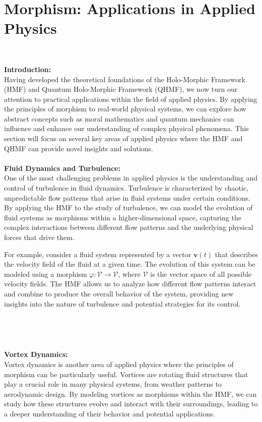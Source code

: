 \documentclass{article}
\begin{document}
\section*{Morphism: Applications in Applied Physics}
\

\textbf{Introduction:}
\\

Having developed the theoretical foundations of the Holo-Morphic Framework (HMF) and Quantum Holo-Morphic Framework (QHMF), we now turn our attention to practical applications within the field of applied physics. By applying the principles of morphism to real-world physical systems, we can explore how abstract concepts such as moral mathematics and quantum mechanics can influence and enhance our understanding of complex physical phenomena. This section will focus on several key areas of applied physics where the HMF and QHMF can provide novel insights and solutions.
\\
\\

\textbf{Fluid Dynamics and Turbulence:}
\\

One of the most challenging problems in applied physics is the understanding and control of turbulence in fluid dynamics. Turbulence is characterized by chaotic, unpredictable flow patterns that arise in fluid systems under certain conditions. By applying the HMF to the study of turbulence, we can model the evolution of fluid systems as morphisms within a higher-dimensional space, capturing the complex interactions between different flow patterns and the underlying physical forces that drive them.

For example, consider a fluid system represented by a vector \( \mathbf{v}(t) \) that describes the velocity field of the fluid at a given time. The evolution of this system can be modeled using a morphism \( \varphi: \mathcal{V} \to \mathcal{V} \), where \( \mathcal{V} \) is the vector space of all possible velocity fields. The HMF allows us to analyze how different flow patterns interact and combine to produce the overall behavior of the system, providing new insights into the nature of turbulence and potential strategies for its control.
\

\

\

\textbf{Vortex Dynamics:}
\\

Vortex dynamics is another area of applied physics where the principles of morphism can be particularly useful. Vortices are rotating fluid structures that play a crucial role in many physical systems, from weather patterns to aerodynamic design. By modeling vortices as morphisms within the HMF, we can study how these structures evolve and interact with their surroundings, leading to a deeper understanding of their behavior and potential applications.
\end{document}
